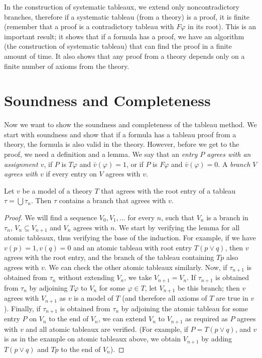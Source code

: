 In the construction of systematic tableaux, we extend only noncontradictory branches, therefore if a systematic tableau (from a theory) is a proof, it is finite (remember that a proof is a contradictory tableau with $F \varphi$ in its root). This is an important result; it shows that if a formula has a proof, we have an algorithm (the construction of systematic tableau) that can find the proof in a finite amount of time. It also shows that any proof from a theory depends only on a finite number of axioms from the theory. 

\section{Soundness and Completeness}

Now we want to show the soundness and completeness of the tableau method. We start with soundness and show that if a formula has a tableau proof from a theory, the formula is also valid in the theory. However, before we get to the proof, we need a definition and a lemma. We say that an \emph{entry $P$ agrees with an assignment $v$}, if $P$ is $T \varphi$ and $\bar{v}(\varphi) = 1$, or if $P$ is $F \varphi$ and $\bar{v}(\varphi) = 0$. A \emph{branch $V$ agrees with $v$} if every entry on $V$ agrees with $v$. 

\begin{lemma}
Let $v$ be a model of a theory $T$ that agrees with the root entry of a tableau $\tau = \bigcup \tau_n$. Then $\tau$ contains a branch that agrees with $v$.
\end{lemma}
\begin{proof}
We will find a sequence $V_0, V_1, \dots$ for every $n$, such that $V_n$ is a branch in $\tau_n$, $V_n \subseteq V_{n+1}$ and $V_n$ agrees with $n$. We start by verifying the lemma for all atomic tableaux, thus verifying the base of the induction. For example, if we have $v(p) = 1, v(q) = 0$ and an atomic tableau with root entry $T(p \lor q)$, then $v$ agrees with the root entry, and the branch of the tableau containing $Tp$ also agrees with $v$. We can check the other atomic tableaux similarly. Now, if $\tau_{n+1}$ is obtained from $\tau_n$ without extending $V_n$, we take $V_{n+1} = V_n$. If $\tau_{n+1}$ is obtained from $\tau_n$ by adjoining $T \varphi$ to $V_n$ for some $\varphi \in T$, let $V_{n+1}$ be this branch; then $v$ agrees with $V_{n+1}$ as $v$ is a model of $T$ (and therefore all axioms of $T$ are true in $v$). Finally, if $\tau_{n+1}$ is obtained from $\tau_n$ by adjoining the atomic tableau for some entry $P$ on $V_n$ to the end of $V_n$, we can extend $V_n$ to $V_{n+1}$ as required as $P$ agrees with $v$ and all atomic tableaux are verified. (For example, if $P = T(p\lor q)$, and $v$ is as in the example on atomic tableaux above, we obtain $V_{n+1}$ by adding $T(p \lor q)$ and $Tp$ to the end of $V_n$).
\end{proof}


